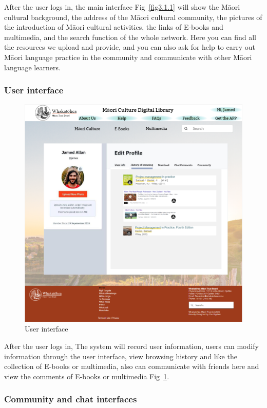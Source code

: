 After the user logs in, the main interface Fig~\ref{fig3.1.1} will show the Māori cultural background, the address of the Māori cultural community, the pictures of the introduction of Māori cultural activities, the links of E-books and multimedia, and the search function of the whole network. Here you can find all the resources we upload and provide, and you can also ask for help to carry out Māori language practice in the community and communicate with other Māori language learners.

\subsubsection{User interface}

\begin{figure}[htbp]
  \centerline{\includegraphics[width=400pt]{images/3-1-2.png}}
  \caption{User interface}
  \label{fig3.1.2}
\end{figure}

After the user logs in, The system will record user information, users can modify information through the user interface, view browsing history and like the collection of E-books or multimedia, also can communicate with friends here and view the comments of E-books or multimedia Fig~\ref{fig3.1.2}.

\subsubsection{Community and chat interfaces}

